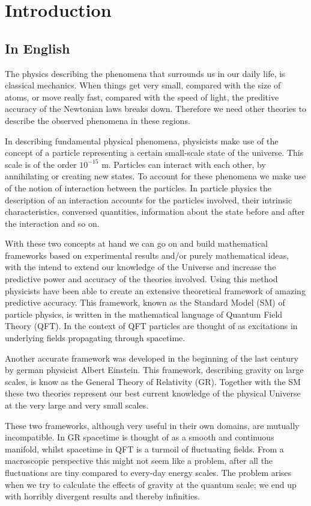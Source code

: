 \section{Introduction}
\subsection{In English}
The physics describing the phenomena that surrounds us in our daily life, is classical mechanics. When things get very small, compared with the size of atoms, or move really fast, compared with the speed of light, the preditive accuracy of the Newtonian laws breaks down. Therefore we need other theories to describe the observed phenomena in these regions.

In describing fundamental physical phenomena, physicists make use of the concept of a particle representing a certain small-scale state of the universe. This scale is of the order $10^{-15}$ m. Particles can interact with each other, by annihilating or creating new states. To account for these phenomena we make use of the notion of interaction between the particles. In particle physics the description of an interaction accounts for the particles involved, their intrinsic characteristics, conversed quantities, information about the state before and after the interaction and so on.

With these two concepts at hand we can go on and build mathematical frameworks based on experimental results and/or purely mathematical ideas, with the intend to extend our knowledge of the Universe and increase the predictive power and accuracy of the theories involved. Using this method physicists have been able to create an extensive theoretical framework of amazing predictive accuracy. This framework, known as the Standard Model (SM) of particle physics, is written in the mathematical language of Quantum Field Theory (QFT). In the context of QFT particles are thought of as excitations in underlying fields propagating through spacetime.

Another accurate framework was developed in the beginning of the last century by german physicist Albert Einstein. This framework, describing gravity on large scales, is know as the General Theory of Relativity (GR). Together with the SM these two theories represent our best current knowledge of the physical Universe at the very large and very small scales.

These two frameworks, although very useful in their own domains, are mutually incompatible. In GR spacetime is thought of as a smooth and continuous manifold, whilst spacetime in QFT is a turmoil of fluctuating fields. From a macroscopic perspective this might not seem like a problem, after all the fluctuations are tiny compared to every-day energy scales. The problem arises when we try to calculate the effects of gravity at the quantum scale; we end up with horribly divergent results and thereby infinities.

